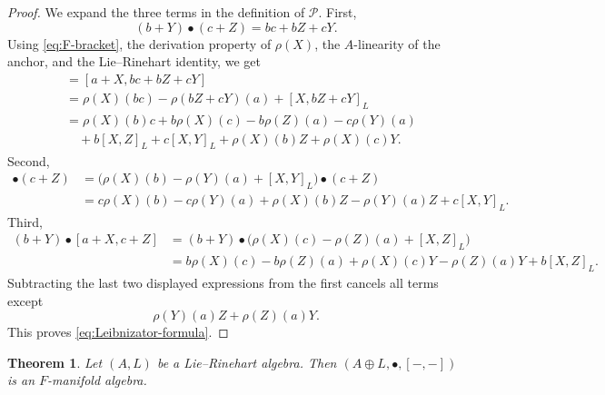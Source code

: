 \documentclass[10pt,a4paper]{amsart}
\newtheorem{theorem}{Theorem}[section]
\newcommand{\Pcal}{\mathcal P}
\begin{document}
	\begin{proof}
		We expand the three terms in the definition of $\Pcal$.  First,
		\[
		(b+Y)\bullet(c+Z)=bc+bZ+cY.
		\]
		Using \eqref{eq:F-bracket}, the derivation property of $\rho(X)$, the
		$A$-linearity of the anchor, and the Lie--Rinehart identity, we get
		\begin{align*}
			[a+X,(b+Y)\bullet(c+Z)]
			&= [a+X,bc+bZ+cY] \\
			&=\rho(X)(bc)-\rho(bZ+cY)(a)+[X,bZ+cY]_L \\
			&=\rho(X)(b)c+b\rho(X)(c)-b\rho(Z)(a)-c\rho(Y)(a) \\
			&\quad +b[X,Z]_L+c[X,Y]_L+\rho(X)(b)Z+\rho(X)(c)Y.
		\end{align*}
		Second,
		\begin{align*}
			[a+X,b+Y]\bullet(c+Z)
			&=\bigl(\rho(X)(b)-\rho(Y)(a)+[X,Y]_L\bigr)\bullet(c+Z) \\
			&=c\rho(X)(b)-c\rho(Y)(a)+\rho(X)(b)Z-\rho(Y)(a)Z+c[X,Y]_L.
		\end{align*}
		Third,
		\begin{align*}
			(b+Y)\bullet[a+X,c+Z]
			&=(b+Y)\bullet\bigl(\rho(X)(c)-\rho(Z)(a)+[X,Z]_L\bigr) \\
			&=b\rho(X)(c)-b\rho(Z)(a)+\rho(X)(c)Y-\rho(Z)(a)Y+b[X,Z]_L.
		\end{align*}
		Subtracting the last two displayed expressions from the first cancels all
		terms except
		\[
		\rho(Y)(a)Z+\rho(Z)(a)Y.
		\]
		This proves \eqref{eq:Leibnizator-formula}.
	\end{proof}
	
	\begin{theorem}\label{thm:LR-to-FMan}
		Let $(A,L)$ be a Lie--Rinehart algebra.  Then
		$(A\oplus L,\bullet,[-,-])$ is an $F$-manifold algebra.
	\end{theorem}
	
\end{document}
